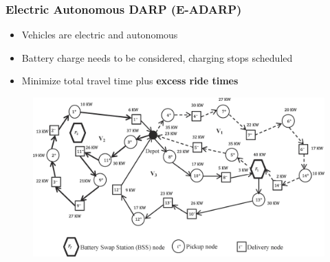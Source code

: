 \documentclass[aspectratio=1610]{beamer}
\newcommand{\important}[1]{{\color{green!60!black}#1}}
\newcommand\soutred{\bgroup\markoverwith{\textcolor{red}{\rule[0.5ex]{2pt}{0.4pt}}}\ULon} %
\let\oldfootnotesize\footnotesize
\renewcommand*{\footnotesize}{\oldfootnotesize\fontsize{6}{4}\selectfont}
\renewcommand{\footnotesize}{\scriptsize}
\begin{document}



\begin{frame}
	\frametitle{Electric Autonomous DARP (E-ADARP) \\ \footnotesize{\textcolor{gray}{\cite{Bongiovanni:2019}}}}

	\begin{itemize}
		\item Vehicles are electric and autonomous
		\item \important{Battery charge} needs to be considered, \important{charging stops} scheduled

		\item Minimize \important{total travel time plus \textbf{excess ride times}}
	\end{itemize}
  
\begin{figure}
	\centering
	\includegraphics[scale=0.80]{graphics/darp-bss-example.jpg}
\end{figure}
	
\end{frame}


	
\end{document}
